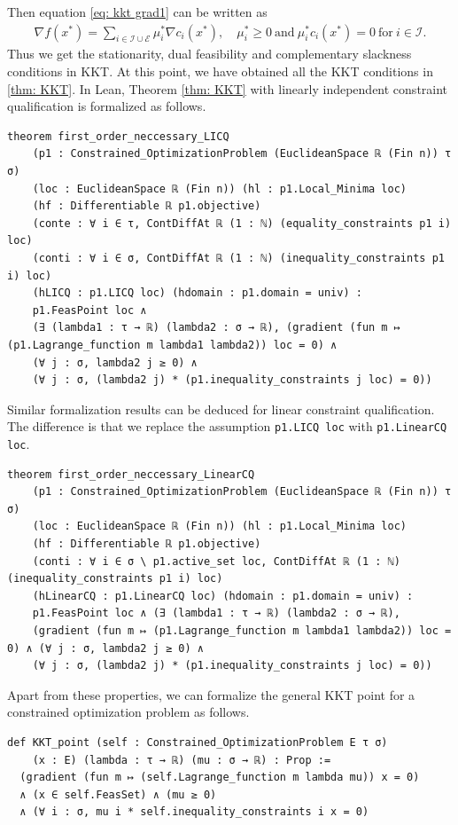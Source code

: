 \documentclass[sn-mathphys]{JORSC-jnl}%
\theoremstyle{thmstyleone}%
\theoremstyle{thmstylethree}%
\newcommand{\lean}[1]{\lstinline[language=lean, mathescape=true]{#1}}
\begin{document}
Then equation \eqref{eq: kkt grad1} can be written as
\begin{align}
    \nabla f(x^\ast) = \sum_{i\in\mathcal{I}\cup\mathcal{E}}\mu_i^\ast\nabla c_i(x^\ast),\quad \mu_i^\ast\geqslant 0\ \text{and}\ \mu_i^\ast c_i(x^\ast) = 0 \ \text{for}\ i \in \mathcal{I}.
    \label{eq: kkt grad2}
\end{align}
Thus we get the stationarity, dual feasibility and complementary slackness conditions in KKT. At this point, we have obtained all the KKT conditions in \eqref{thm: KKT}. In Lean, Theorem \ref{thm: KKT} with linearly independent constraint qualification is formalized as follows.
\begin{lstlisting}
theorem first_order_neccessary_LICQ
    (p1 : Constrained_OptimizationProblem (EuclideanSpace ℝ (Fin n)) τ σ)
    (loc : EuclideanSpace ℝ (Fin n)) (hl : p1.Local_Minima loc)
    (hf : Differentiable ℝ p1.objective)
    (conte : ∀ i ∈ τ, ContDiffAt ℝ (1 : ℕ) (equality_constraints p1 i) loc)
    (conti : ∀ i ∈ σ, ContDiffAt ℝ (1 : ℕ) (inequality_constraints p1 i) loc)
    (hLICQ : p1.LICQ loc) (hdomain : p1.domain = univ) :
    p1.FeasPoint loc ∧
    (∃ (lambda1 : τ → ℝ) (lambda2 : σ → ℝ), (gradient (fun m ↦ (p1.Lagrange_function m lambda1 lambda2)) loc = 0) ∧
    (∀ j : σ, lambda2 j ≥ 0) ∧
    (∀ j : σ, (lambda2 j) * (p1.inequality_constraints j loc) = 0))
\end{lstlisting}
Similar formalization results can be deduced for linear constraint qualification. The difference is that we replace the assumption \lean{p1.LICQ loc} with \lean{p1.LinearCQ loc}.
\vspace{0.5cm}
\begin{lstlisting}
theorem first_order_neccessary_LinearCQ
    (p1 : Constrained_OptimizationProblem (EuclideanSpace ℝ (Fin n)) τ σ)
    (loc : EuclideanSpace ℝ (Fin n)) (hl : p1.Local_Minima loc)
    (hf : Differentiable ℝ p1.objective)
    (conti : ∀ i ∈ σ \ p1.active_set loc, ContDiffAt ℝ (1 : ℕ) (inequality_constraints p1 i) loc)
    (hLinearCQ : p1.LinearCQ loc) (hdomain : p1.domain = univ) :
    p1.FeasPoint loc ∧ (∃ (lambda1 : τ → ℝ) (lambda2 : σ → ℝ),
    (gradient (fun m ↦ (p1.Lagrange_function m lambda1 lambda2)) loc = 0) ∧ (∀ j : σ, lambda2 j ≥ 0) ∧
    (∀ j : σ, (lambda2 j) * (p1.inequality_constraints j loc) = 0)) 
\end{lstlisting}
Apart from these properties, we can formalize the general KKT point for a constrained optimization problem as follows.
\begin{lstlisting}
def KKT_point (self : Constrained_OptimizationProblem E τ σ)
    (x : E) (lambda : τ → ℝ) (mu : σ → ℝ) : Prop :=
  (gradient (fun m ↦ (self.Lagrange_function m lambda mu)) x = 0) 
  ∧ (x ∈ self.FeasSet) ∧ (mu ≥ 0) 
  ∧ (∀ i : σ, mu i * self.inequality_constraints i x = 0)
\end{lstlisting}
\end{document}
